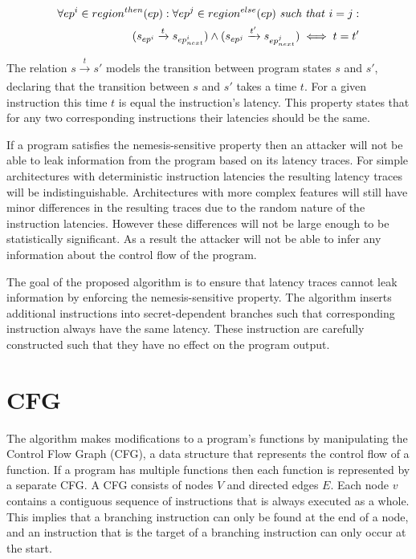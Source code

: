 \begin{equation} \label{eq:nemesisProperty}
    \begin{split}
    \forall ep^i \in region^{then}(ep) : \forall ep^j \in region^{else}(ep) \text{ \textit{such that} } i=j :  \\ 
    (s_{ep^i} \xrightarrow[]{t} s_{ep^i_{next}}) \land (s_{ep^j} \xrightarrow[]{t'} s_{ep^j_{next}}) \iff t = t' \\ 
    \end{split}
\end{equation}
\cite{MSP430Detection}

The relation $s \xrightarrow[]{t} s'$ models the transition between program states $s$ and $s'$, declaring that the transition between $s$ and $s'$ takes a time $t$. 
For a given instruction this time $t$ is equal the instruction's latency. This property states that for any two corresponding instructions their latencies should be the same.

If a program satisfies the nemesis-sensitive property then an attacker will not be able to leak information from the program based on its latency traces.
For simple architectures with deterministic instruction latencies the resulting latency traces will be indistinguishable. 
Architectures with more complex features will still have minor differences in the resulting traces due to the random nature of the instruction latencies. 
However these differences will not be large enough to be statistically significant.
As a result the attacker will not be able to infer any information about the control flow of the program. 

The goal of the proposed algorithm is to ensure that latency traces cannot leak information by enforcing the nemesis-sensitive property.
The algorithm inserts additional instructions into secret-dependent branches such that corresponding instruction always have the same latency. 
These instruction are carefully constructed such that they have no effect on the program output. 

\section{CFG}\label{sec:cfg}

The algorithm makes modifications to a program's functions by manipulating the Control Flow Graph (CFG), a data structure that represents the control flow of a function.
If a program has multiple functions then each function is represented by a separate CFG. 
A CFG consists of nodes $V$ and directed edges $E$. Each node $v$ contains a 
contiguous sequence of instructions that is always executed as a whole. This implies that a branching instruction can only be found at the end of a node, 
and an instruction that is the target of a branching instruction can only occur at the start.

